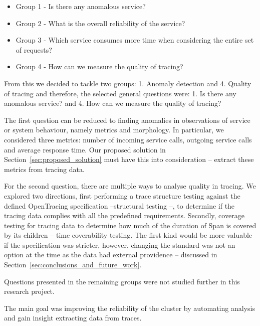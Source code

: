 \begin{itemize}
    \item Group 1 - Is there any anomalous service?
    \item Group 2 - What is the overall reliability of the service?
    \item Group 3 - Which service consumes more time when considering the entire set of requests?
    \item Group 4 - How can we measure the quality of tracing?
\end{itemize}

From this we decided to tackle two groups: 1. Anomaly detection and 4. Quality of tracing and therefore, the selected general questions were: 1. Is there any anomalous service? and 4. How can we measure the quality of tracing?

The first question can be reduced to finding anomalies in observations of service or system behaviour, namely metrics and morphology.
In particular, we considered three metrics: number of incoming service calls, outgoing service calls and average response time. Our proposed solution in Section~\ref{sec:proposed_solution} must have this into consideration -- extract these metrics from tracing data.

For the second question, there are multiple ways to analyse quality in tracing. We explored two directions, first performing a trace structure testing against the defined OpenTracing specification --structural testing --, to determine if the tracing data complies with all the predefined requirements. Secondly, coverage testing for tracing data to determine how much of the duration of Span is covered by its children -- time coverability testing. The first kind would be more valuable if the specification was stricter, however, changing the standard was not an option at the time as the data had external providence -- discussed in Section~\ref{sec:conclusions_and_future_work}.

Questions presented in the remaining groups were not studied further in this research project.


The main goal was improving the reliability of the cluster by automating analysis and gain insight extracting data from traces.






